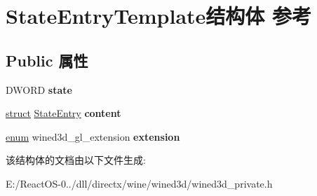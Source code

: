 \hypertarget{struct_state_entry_template}{}\section{State\+Entry\+Template结构体 参考}
\label{struct_state_entry_template}
\subsection*{Public 属性}
\begin{DoxyCompactItemize}
\item 
\mbox{\label{struct_state_entry_template_a30f88ace38bbec9fe9e742dd839a0203}} 
D\+W\+O\+RD {\bfseries state}
\item 
\mbox{\label{struct_state_entry_template_aee5341be28575fa05647b9a4fe8209ca}} 
\hyperlink{interfacestruct}{struct} \hyperlink{struct_state_entry}{State\+Entry} {\bfseries content}
\item 
\mbox{\label{struct_state_entry_template_ab096c0dbc8ec54a0f01c1baade8fb712}} 
\hyperlink{interfaceenum}{enum} wined3d\+\_\+gl\+\_\+extension {\bfseries extension}
\end{DoxyCompactItemize}


该结构体的文档由以下文件生成\+:\begin{DoxyCompactItemize}
\item 
E\+:/\+React\+O\+S-\/0../dll/directx/wine/wined3d/wined3d\+\_\+private.\+h\end{DoxyCompactItemize}
